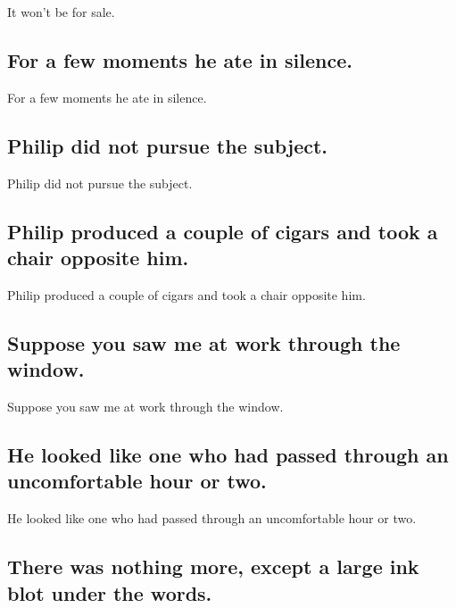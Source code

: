 \documentclass[]{article}
\begin{document}
It won't be for sale.

\hypertarget{for-a-few-moments-he-ate-in-silence.}{%
\subsection{For a few moments he ate in
silence.}\label{for-a-few-moments-he-ate-in-silence.}}

For a few moments he ate in silence.

\hypertarget{philip-did-not-pursue-the-subject.}{%
\subsection{Philip did not pursue the
subject.}\label{philip-did-not-pursue-the-subject.}}

Philip did not pursue the subject.

\hypertarget{philip-produced-a-couple-of-cigars-and-took-a-chair-opposite-him.}{%
\subsection{Philip produced a couple of cigars and took a chair opposite
him.}\label{philip-produced-a-couple-of-cigars-and-took-a-chair-opposite-him.}}

Philip produced a couple of cigars and took a chair opposite him.

\hypertarget{suppose-you-saw-me-at-work-through-the-window.}{%
\subsection{Suppose you saw me at work through the
window.}\label{suppose-you-saw-me-at-work-through-the-window.}}

Suppose you saw me at work through the window.

\hypertarget{he-looked-like-one-who-had-passed-through-an-uncomfortable-hour-or-two.}{%
\subsection{He looked like one who had passed through an uncomfortable
hour or
two.}\label{he-looked-like-one-who-had-passed-through-an-uncomfortable-hour-or-two.}}

He looked like one who had passed through an uncomfortable hour or two.

\hypertarget{there-was-nothing-more-except-a-large-ink-blot-under-the-words.}{%
\subsection{There was nothing more, except a large ink blot under the
words.}\label{there-was-nothing-more-except-a-large-ink-blot-under-the-words.}}
\end{document}
